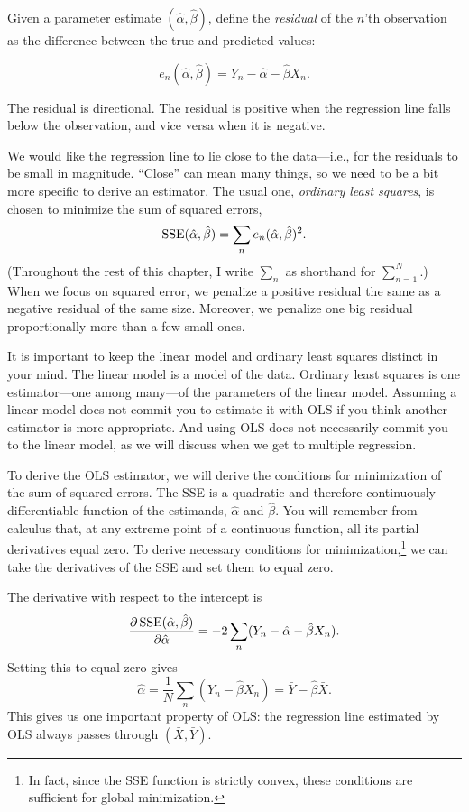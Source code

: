 \documentclass[12pt,oneside,openany]{book}
\begin{document}
Given a parameter estimate \((\hat{\alpha}, \hat{\beta})\), define the
\emph{residual} of the \(n\)'th observation as the difference between
the true and predicted values:

\begin{equation}
e_n(\hat{\alpha}, \hat{\beta}) = Y_n - \hat{\alpha} - \hat{\beta} X_n.
\end{equation}

The residual is directional. The residual is positive when the
regression line falls below the observation, and vice versa when it is
negative.

We would like the regression line to lie close to the data---i.e., for
the residuals to be small in magnitude. ``Close'' can mean many things,
so we need to be a bit more specific to derive an estimator. The usual
one, \emph{ordinary least squares}, is chosen to minimize the sum of
squared errors, \[
\mathop{\rm SSE}\nolimits(\hat{\alpha}, \hat{\beta}) = \sum_n e_n(\hat{\alpha}, \hat{\beta})^2.
\] (Throughout the rest of this chapter, I write \(\sum_n\) as shorthand
for \(\sum_{n=1}^N\).) When we focus on squared error, we penalize a
positive residual the same as a negative residual of the same size.
Moreover, we penalize one big residual proportionally more than a few
small ones.

It is important to keep the linear model and ordinary least squares
distinct in your mind. The linear model is a model of the data. Ordinary
least squares is one estimator---one among many---of the parameters of
the linear model. Assuming a linear model does not commit you to
estimate it with OLS if you think another estimator is more appropriate.
And using OLS does not necessarily commit you to the linear model, as we
will discuss when we get to multiple regression.

To derive the OLS estimator, we will derive the conditions for
minimization of the sum of squared errors. The SSE is a quadratic and
therefore continuously differentiable function of the estimands,
\(\hat{\alpha}\) and \(\hat{\beta}\). You will remember from calculus
that, at any extreme point of a continuous function, all its partial
derivatives equal zero. To derive necessary conditions for
minimization,\footnote{In fact, since the SSE function is strictly
  convex, these conditions are sufficient for global minimization.} we
can take the derivatives of the SSE and set them to equal zero.

The derivative with respect to the intercept is \[
\frac{\partial{}\mathop{\rm SSE}\nolimits(\hat{\alpha}, \hat{\beta})}{\partial{}\hat{\alpha}}
= -2 \sum_n (Y_n - \hat{\alpha} - \hat{\beta} X_n).
\] Setting this to equal zero gives \[
\hat{\alpha}
= \frac{1}{N} \sum_n (Y_n - \hat{\beta} X_n)
= \bar{Y} - \hat{\beta} \bar{X}.
\] This gives us one important property of OLS: the regression line
estimated by OLS always passes through \((\bar{X}, \bar{Y})\).
\end{document}
